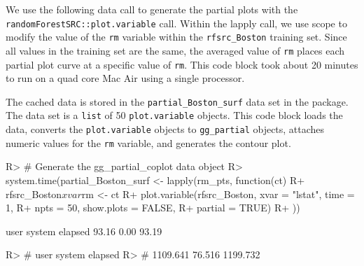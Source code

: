 \documentclass[article]{jss}
\begin{document}
We use the following data call to generate the partial plots with the
\texttt{randomForestSRC::plot.variable} call. Within the lapply call, we
use scope to modify the value of the \texttt{rm} variable within the
\texttt{rfsrc\_Boston} training set. Since all values in the training
set are the same, the averaged value of \texttt{rm} places each partial
plot curve at a specific value of \texttt{rm}. This code block took
about 20 minutes to run on a quad core Mac Air using a single processor.

The cached data is stored in the \texttt{partial\_Boston\_surf} data set
in the  package. The data set is a \texttt{list} of
50 \texttt{plot.variable} objects. This code block loads the data,
converts the \texttt{plot.variable} objects to \texttt{gg\_partial}
objects, attaches numeric values for the \texttt{rm} variable, and
generates the contour plot.

\begin{CodeChunk}

\begin{CodeInput}
R> # Generate the gg_partial_coplot data object
R> system.time(partial_Boston_surf <- lapply(rm_pts, function(ct){
R+   rfsrc_Boston$xvar$rm <- ct
R+   plot.variable(rfsrc_Boston, xvar = "lstat", time = 1,
R+                 npts = 50, show.plots = FALSE, 
R+                 partial = TRUE)
R+ }))
\end{CodeInput}

\begin{CodeOutput}
   user  system elapsed 
  93.16    0.00   93.19 
\end{CodeOutput}

\begin{CodeInput}
R> #     user   system  elapsed 
R> # 1109.641   76.516 1199.732 
\end{CodeInput}
\end{CodeChunk}
\end{document}
